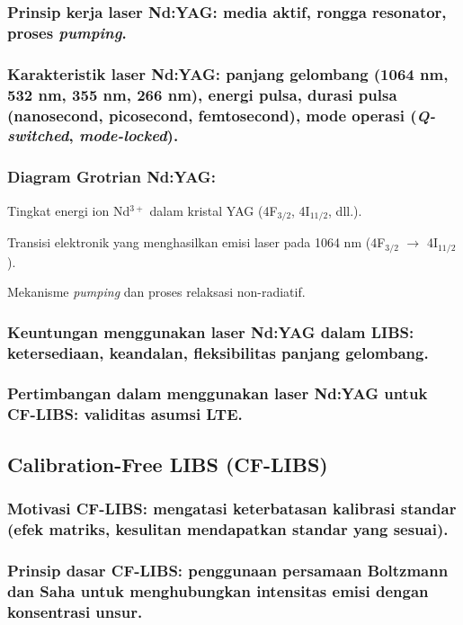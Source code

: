 \subsubsection{Prinsip kerja laser Nd:YAG: media aktif, rongga resonator, proses \textit{pumping}.}
\subsubsection{Karakteristik laser Nd:YAG: panjang gelombang (1064 nm, 532 nm, 355 nm, 266 nm), energi pulsa, durasi pulsa (nanosecond, picosecond, femtosecond), mode operasi (\textit{Q-switched}, \textit{mode-locked}).}

\subsubsection{Diagram Grotrian Nd:YAG:}


\par Tingkat energi ion Nd$^{3+}$ dalam kristal YAG (4F$_{3/2}$, 4I$_{11/2}$, dll.).
\par Transisi elektronik yang menghasilkan emisi laser pada 1064 nm (4F$_{3/2}$ $\rightarrow$ 4I$_{11/2}$).
\par Mekanisme \textit{pumping} dan proses relaksasi non-radiatif.

\subsubsection{Keuntungan menggunakan laser Nd:YAG dalam LIBS: ketersediaan, keandalan, fleksibilitas panjang gelombang.}
\subsubsection{Pertimbangan dalam menggunakan laser Nd:YAG untuk CF-LIBS: validitas asumsi LTE.}


\subsection{Calibration-Free LIBS (CF-LIBS)}

\subsubsection{Motivasi CF-LIBS: mengatasi keterbatasan kalibrasi standar (efek matriks, kesulitan mendapatkan standar yang sesuai).}
\subsubsection{Prinsip dasar CF-LIBS: penggunaan persamaan Boltzmann dan Saha untuk menghubungkan intensitas emisi dengan konsentrasi unsur.}
